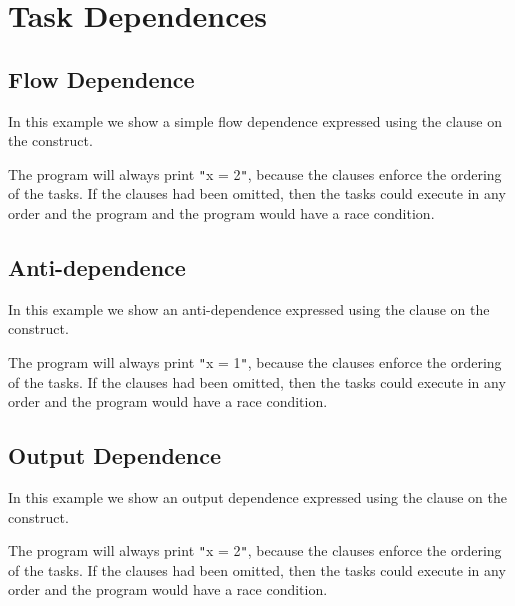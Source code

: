 \pagebreak
\section{Task Dependences}
\label{sec:task_depend}

\subsection{Flow Dependence}
\label{subsec:task_flow_depend}

In this example we show a simple flow dependence expressed using the  
clause on the  construct.



The program will always print \texttt{"}x = 2\texttt{"}, because the  
clauses enforce the ordering of the tasks. If the  clauses had been 
omitted, then the tasks could execute in any order and the program and the program 
would have a race condition.

\subsection{Anti-dependence}
\label{subsec:task_anti_depend}

In this example we show an anti-dependence expressed using the  
clause on the  construct.



The program will always print \texttt{"}x = 1\texttt{"}, because the  
clauses enforce the ordering of the tasks. If the  clauses had been 
omitted, then the tasks could execute in any order and the program would have a 
race condition.

\subsection{Output Dependence}
\label{subsec:task_out_depend}

In this example we show an output dependence expressed using the  
clause on the  construct.



The program will always print \texttt{"}x = 2\texttt{"}, because the  
clauses enforce the ordering of the tasks. If the  clauses had been 
omitted, then the tasks could execute in any order and the program would have a 
race condition.

